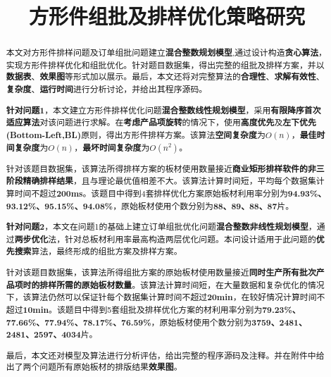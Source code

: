 \documentclass[bwprint]{gmcmthesis}
\title{方形件组批及排样优化策略研究}
\begin{document}
\sloppy

 \maketitle

\begin{abstract}
本文对方形件排样问题及订单组批问题建立\textbf{混合整数规划模型},通过设计构造\textbf{贪心算法}，实现方形件排样优化和组批优化。针对题目数据集，得出完整的组批及排样方案，并以\textbf{数据表}、\textbf{效果图}等形式加以展示。最后，本文还将对完整算法的\textbf{合理性}、\textbf{求解有效性}、\textbf{复杂度}、\textbf{运行时间}进行分析讨论，并给出其程序源码。

\textbf{针对问题1}，本文建立方形件排样优化问题\textbf{混合整数线性规划模型}，采用\textbf{有限降序首次适应算法}对该问题进行求解。在\textbf{考虑产品项旋转}的情况下，使用\textbf{高度优先}及\textbf{左下优先(Bottom-Left,BL)}原则，得出方形件排样方案。该算法\textbf{空间复杂度}为$O(n)$，\textbf{最佳时间复杂度}为$O(n)$，\textbf{最坏时间复杂度}为$O(n^2)$。

针对该题目数据集，该算法所得排样方案的板材使用数量接近\textbf{商业矩形排样软件的非三阶段精确排样结果}，且与理论最优值相差不大。该算法计算时间短，平均每个数据集计算时间不超过\textbf{200ms}。该题目中得到4套排样优化方案原始板材利用率分别为\textbf{94.93\%、93.12\%、95.15\%、94.08\%}，原始板材使用个数分别为\textbf{88、89、88、87}片。

\textbf{针对问题2}，本文在问题1的基础上建立订单组批优化问题\textbf{混合整数非线性规划模型}，通过\textbf{两步优化}法，针对总板材利用率最高构造两层优化问题。本问设计适用于此问题的\textbf{优先搜索}算法，最终形成的组批方案及排样方案。

针对该题目数据集，该算法所得组批方案的原始板材使用数量接近\textbf{同时生产所有批次产品项时的排样所需的原始板材数量}。该算法计算时间短，在大量数据和复杂优化的情况下，该算法仍然可以保证针每个数据集计算时间不超过\textbf{20min}，在较好情况计算时间不超过\textbf{10min}。该题目中得到5套组批及排样优化方案的材利用率分别为\textbf{79.23\%、77.66\%、77.94\%、78.17\%、76.59\%}，原始板材使用个数分别为\textbf{3759、2481、2481、2597、4034}片。

最后，本文还对模型及算法进行分析评估，给出完整的程序源码及注释。并在附件中给出了两个问题所有原始板材的排版结果\textbf{效果图}。

\end{abstract}
\end{document}
